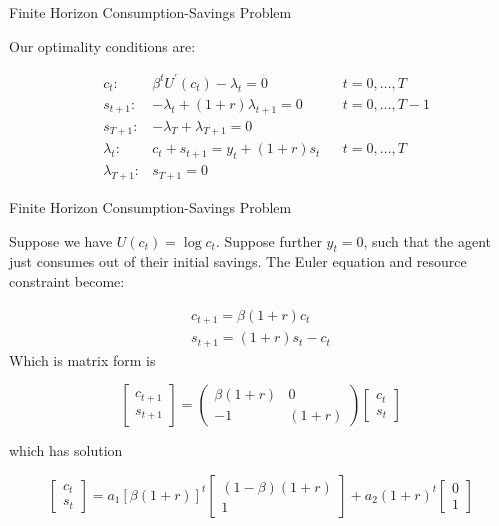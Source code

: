 \documentclass[11pt, xcolor={dvipsnames}, hyperref={colorlinks, allcolors=Blue}]{beamer}
\begin{document}
\begin{frame}{Finite Horizon Consumption-Savings Problem}

Our optimality conditions are:

\begin{align*}
&c_{t}:&      \beta^{t} U^{\prime}(c_{t}) - \lambda_{t} = 0  &  &t = 0,\dots, T\\
&s_{t+1}:&  -\lambda_{t} + (1+r)\lambda_{t+1} = 0         && t = 0, \dots, T-1\\
&s_{T+1}:& -\lambda_{T} + \lambda_{T+1} = 0 && \\
&\lambda_{t}:& c_{t} + s_{t+1} = y_{t} + (1+r)s_{t} && t = 0, \dots, T\\
&\lambda_{T+1}:& s_{T+1} = 0&&
\end{align*}

\end{frame}
\begin{frame}{Finite Horizon Consumption-Savings Problem}

Suppose we have $U(c_{t}) = \log c_{t}$. Suppose further $y_{t} = 0$, such that the agent just consumes out of their initial savings. The Euler equation and resource constraint become:

\begin{gather*}
c_{t+1} = \beta (1+r) c_{t}\\
s_{t+1} = (1+r)s_{t} - c_{t}
\end{gather*}
Which is matrix form is

\[\begin{bmatrix} c_{t+1} \\ s_{t+1}\end{bmatrix} = \begin{pmatrix}\beta(1+r) & 0\\ -1 & (1+r)\end{pmatrix} \begin{bmatrix} c_{t} \\ s_{t}\end{bmatrix}\]

which has solution

\[\begin{bmatrix} c_{t} \\ s_{t}\end{bmatrix} = a_{1} [\beta(1+r)]^{t} \begin{bmatrix} (1-\beta)(1+r) \\ 1 \end{bmatrix} + a_{2} (1+r)^{t} \begin{bmatrix} 0 \\ 1\end{bmatrix}\]

\end{frame}
\end{document}
